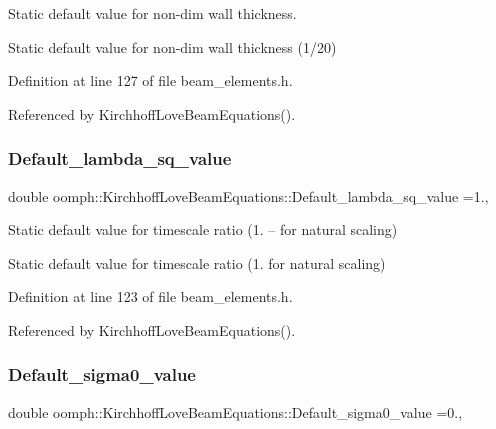 Static default value for non-\/dim wall thickness. 

Static default value for non-\/dim wall thickness (1/20) 

Definition at line 127 of file beam\+\_\+elements.\+h.



Referenced by Kirchhoff\+Love\+Beam\+Equations().

\mbox{\label{classoomph_1_1KirchhoffLoveBeamEquations_a965ef43850af9f156cc46d35d536edc1}} 
\subsubsection{\texorpdfstring{Default\+\_\+lambda\+\_\+sq\+\_\+value}{Default\_lambda\_sq\_value}}
{\footnotesize\ttfamily double oomph\+::\+Kirchhoff\+Love\+Beam\+Equations\+::\+Default\+\_\+lambda\+\_\+sq\+\_\+value =1.\hspace{0.3cm}{\ttfamily [static]}, {\ttfamily [private]}}



Static default value for timescale ratio (1. -- for natural scaling) 

Static default value for timescale ratio (1. for natural scaling) 

Definition at line 123 of file beam\+\_\+elements.\+h.



Referenced by Kirchhoff\+Love\+Beam\+Equations().

\mbox{\label{classoomph_1_1KirchhoffLoveBeamEquations_a22ce2707713186c808aedc32bd12be3c}} 
\subsubsection{\texorpdfstring{Default\+\_\+sigma0\+\_\+value}{Default\_sigma0\_value}}
{\footnotesize\ttfamily double oomph\+::\+Kirchhoff\+Love\+Beam\+Equations\+::\+Default\+\_\+sigma0\+\_\+value =0.\hspace{0.3cm}{\ttfamily [static]}, {\ttfamily [private]}}



